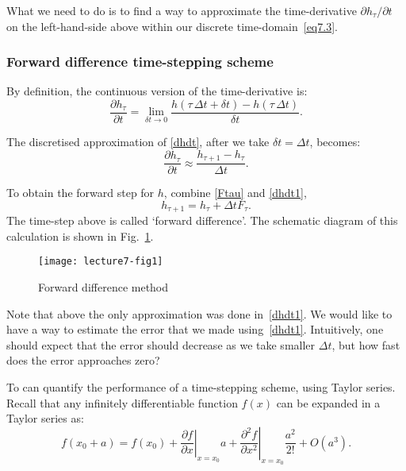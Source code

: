 What we need to do is to find a way to approximate the time-derivative $\partial h_\tau/\partial t$ on the left-hand-side above within our discrete time-domain~\eqref{eq7.3}.


\subsubsection*{Forward difference time-stepping scheme}

By definition, the continuous version of the time-derivative is:
\begin{equation}
\frac{\partial h_{\tau}}{\partial t}=\displaystyle \lim_{\delta t\to 0}\frac{h(\tau\,\Delta t+\delta t)-h(\tau\,\Delta t)}{\delta t}.
\label{dhdt}
\end{equation}

The discretised approximation of \eqref{dhdt}, after we take $\delta t = \Delta t$, becomes:
\begin{equation}
\frac{\partial h_{\tau}}{\partial t} \approx \frac{h_{\tau +1}-h_{\tau}}{\Delta t}.
\label{dhdt1}
\end{equation}

To obtain the forward step for $h$, combine \eqref{Ftau} and \eqref{dhdt1}, 
\begin{equation}
h_{\tau+1}=h_{\tau}+\Delta t F_{\tau}.
\label{fdt}
\end{equation}
The time-step above is called `forward difference'. The schematic diagram of this calculation is shown in Fig.~\ref{fddiagram}.
\begin{figure}[h!]
\centering
\texttt{[image: lecture7-fig1]}
\caption{Forward difference method}
\label{fddiagram}
\end{figure}

Note that above the only approximation was done in~\eqref{dhdt1}. We would like to have a way to estimate the error that we made using~\eqref{dhdt1}. Intuitively, one should expect that the error should decrease as we take smaller $\Delta t$, but how fast does the error approaches zero?

To can quantify the performance of a time-stepping scheme, using Taylor series. Recall that any infinitely differentiable function $f(x)$ can be expanded  in a Taylor series as: 
\begin{equation}
f(x_0+a)=f(x_0) + \left.\frac{\partial f}{\partial x}\right|_{x=x_0} a + \left.\frac{\partial^{2}f}{\partial x^{2}}\right|_{x=x_0}\frac{a^{2}}{2!} + O(a^{3}).
\label{TS}
\end{equation}

